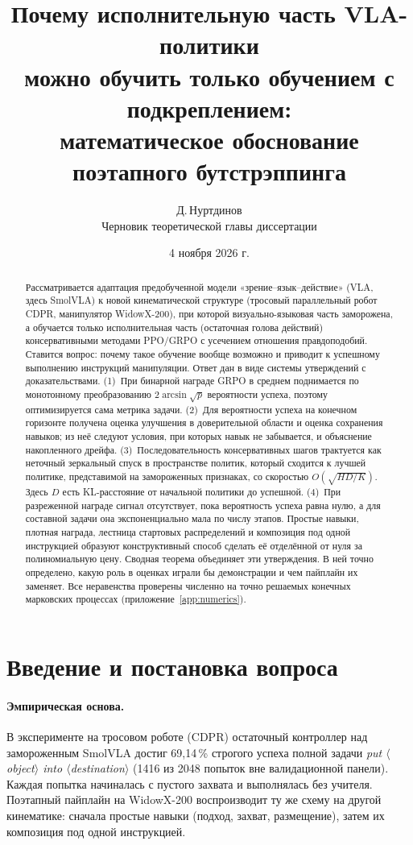 \documentclass[11pt,a4paper]{article}
\title{Почему исполнительную часть VLA-политики\\можно обучить только обучением с подкреплением:\\математическое обоснование поэтапного бутстрэппинга}
\author{Д.\,Нуртдинов\\[2pt]\small Черновик теоретической главы диссертации}
\date{4 ноября 2026 г.}
\theoremstyle{plain}
\theoremstyle{definition}
\theoremstyle{remark}
\begin{document}
\maketitle

\begin{abstract}
Рассматривается адаптация предобученной модели «зрение--язык--действие» (VLA, здесь SmolVLA) к новой кинематической структуре (тросовый параллельный робот CDPR, манипулятор WidowX-200), при которой визуально-языковая часть заморожена, а обучается только исполнительная часть (остаточная голова действий) консервативными методами PPO/GRPO с усечением отношения правдоподобий. Ставится вопрос: почему такое обучение вообще возможно и приводит к успешному выполнению инструкций манипуляции. Ответ дан в виде системы утверждений с доказательствами. (1)~При бинарной награде GRPO в среднем поднимается по монотонному преобразованию $2\arcsin\sqrt{p}$ вероятности успеха, поэтому оптимизируется сама метрика задачи. (2)~Для вероятности успеха на конечном горизонте получена оценка улучшения в доверительной области и оценка сохранения навыков; из неё следуют условия, при которых навык не забывается, и объяснение накопленного дрейфа. (3)~Последовательность консервативных шагов трактуется как неточный зеркальный спуск в пространстве политик, который сходится к лучшей политике, представимой на замороженных признаках, со скоростью $O(\sqrt{H D/K})$. Здесь $D$ есть KL-расстояние от начальной политики до успешной. (4)~При разреженной награде сигнал отсутствует, пока вероятность успеха равна нулю, а для составной задачи она экспоненциально мала по числу этапов. Простые навыки, плотная награда, лестница стартовых распределений и композиция под одной инструкцией образуют конструктивный способ сделать её отделённой от нуля за полиномиальную цену. Сводная теорема объединяет эти утверждения. В ней точно определено, какую роль в оценках играли бы демонстрации и чем пайплайн их заменяет. Все неравенства проверены численно на точно решаемых конечных марковских процессах (приложение~\ref{app:numerics}).
\end{abstract}

\tableofcontents

\section{Введение и постановка вопроса}\label{sec:intro}

\paragraph{Эмпирическая основа.} В эксперименте на тросовом роботе (CDPR) остаточный контроллер над замороженным SmolVLA достиг 69{,}14\,\% строгого успеха полной задачи \emph{put $\langle$object$\rangle$ into $\langle$destination$\rangle$} (1416 из 2048 попыток вне валидационной панели). Каждая попытка начиналась с пустого захвата и выполнялась без учителя. Поэтапный пайплайн на WidowX-200 воспроизводит ту же схему на другой кинематике: сначала простые навыки (подход, захват, размещение), затем их композиция под одной инструкцией.
\end{document}
